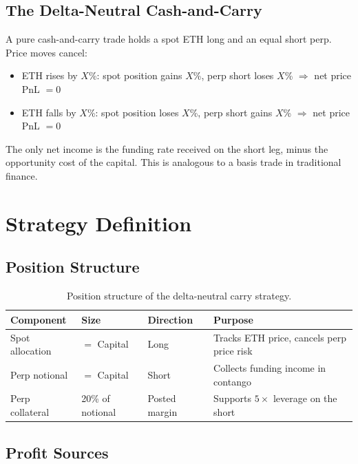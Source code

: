 \documentclass[11pt,a4paper]{article}
\begin{document}
\subsection{The Delta-Neutral Cash-and-Carry}

A pure cash-and-carry trade holds a spot ETH long and an equal short perp. Price moves cancel:
\begin{itemize}
    \item ETH rises by $X$\%: spot position gains $X$\%, perp short loses $X$\% $\Rightarrow$ net price PnL $= 0$
    \item ETH falls by $X$\%: spot position loses $X$\%, perp short gains $X$\% $\Rightarrow$ net price PnL $= 0$
\end{itemize}

The only net income is the funding rate received on the short leg, minus the opportunity cost of the capital. This is analogous to a basis trade in traditional finance.

\section{Strategy Definition}

\subsection{Position Structure}

\begin{table}[h!]
\centering
\caption{Position structure of the delta-neutral carry strategy.}
\begin{tabular}{@{}llll@{}}
\toprule
\textbf{Component} & \textbf{Size} & \textbf{Direction} & \textbf{Purpose} \\
\midrule
Spot allocation    & $=$ Capital         & Long  & Tracks ETH price, cancels perp price risk \\
Perp notional      & $=$ Capital         & Short & Collects funding income in contango \\
Perp collateral    & 20\% of notional    & Posted margin & Supports $5\times$ leverage on the short \\
\bottomrule
\end{tabular}
\end{table}

\subsection{Profit Sources}
\end{document}
